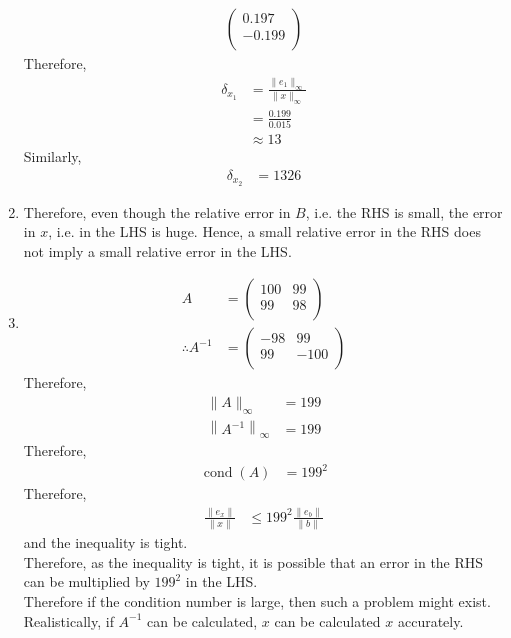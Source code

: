 \documentclass[fleqn, a4paper, 12pt, twoside]{article}
\theoremstyle{definition}
\theoremstyle{theorem}
\DeclareMathOperator{\cond}{cond}
\begin{document}
\begin{solution}
\begin{enumerate}[leftmargin=*]
\begin{align*}
\begin{pmatrix}
						0.197  \\
						-0.199 \\
					\end{pmatrix}
			\end{align*}
			Therefore,
			\begin{align*}
				\delta_{x_1} & = \frac{\|e_1\|_{\infty}}{\|x\|_{\infty}} \\
                                             & = \frac{0.199}{0.015}                     \\
                                             & \approx 13
			\end{align*}
			Similarly,
			\begin{align*}
				\delta_{x_2} & = 1326
			\end{align*}
		\item
			Therefore, even though the relative error in $B$, i.e. the RHS is small, the error in $x$, i.e. in the LHS is huge.
			Hence, a small relative error in the RHS does not imply a small relative error in the LHS.
		\item
			\begin{align*}
				A &=
					\begin{pmatrix}
						100 & 99 \\
						99  & 98 \\
					\end{pmatrix}\\
				\therefore A^{-1} &=
					\begin{pmatrix}
						-98 & 99   \\
						99  & -100 \\
					\end{pmatrix}
			\end{align*}
			Therefore,
			\begin{align*}
				\|A\|_{\infty}                   & = 199 \\
				\left\| A^{-1} \right\|_{\infty} & = 199
			\end{align*}
			Therefore,
			\begin{align*}
				\cond(A) & = 199^2
			\end{align*}
			Therefore,
			\begin{align*}
				\frac{\|e_x\|}{\|x\|} & \le 199^2 \frac{\|e_b\|}{\|b\|}
			\end{align*}
			and the inequality is tight.\\
			Therefore, as the inequality is tight, it is possible that an error in the RHS can be multiplied by $199^2$ in the LHS.\\
			Therefore if the condition number is large, then such a problem might exist.
			\marginnote
			{
				Realistically, if $A^{-1}$ can be calculated, $x$ can be calculated $x$ accurately.
			}
	\end{enumerate}
\end{solution}
\end{document}
